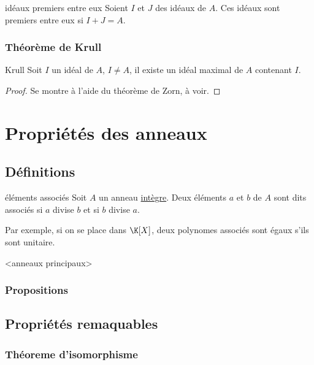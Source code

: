 \begin{proposition}{idéaux premiers entre eux}{}
    Soient $I$ et $J$ des idéaux de $A$. Ces idéaux sont premiers entre eux si $I + J = A$.
    
\end{proposition}

\subsubsection{Théorème de Krull}

\begin{theorem}{Krull}{}
    Soit $I$ un idéal de $A$, $I \neq A$, il existe un idéal maximal de $A$ contenant $I$.
\end{theorem}

\begin{proof}
    Se montre à l'aide du théorème de Zorn, à voir.
\end{proof}



\newpage

\section{Propriétés des anneaux}

\subsection{Définitions}

\begin{definition}{éléments associés}{}
    Soit $A$ un anneau \underline{intègre}.
    Deux éléments $a$ et $b$ de $A$ sont dits associés si $a$ divise $b$ et si $b$ divise $a$.
\end{definition}

Par exemple, si on se place dans $\K[X]$, deux polynomes associés sont égaux s'ils sont unitaire.

<anneaux principaux>



\subsubsection{Propositions}


\subsection{Propriétés remaquables}

\subsubsection{Théoreme d'isomorphisme}

